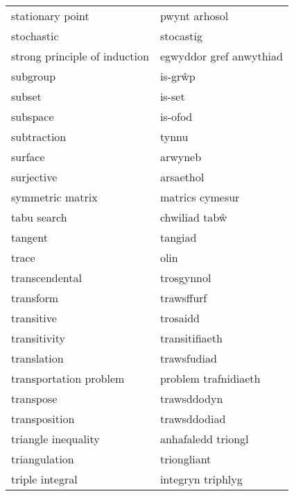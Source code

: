 \begin{supertabular}{p{0.22\textwidth}p{0.22\textwidth}}
                stationary point &                   pwynt arhosol \\
                      stochastic &                       stocastig \\
   strong principle of induction &         egwyddor gref anwythiad \\
                        subgroup &                         is-grŵp \\
                          subset &                          is-set \\
                        subspace &                         is-ofod \\
                     subtraction &                           tynnu \\
                         surface &                         arwyneb \\
                      surjective &                       arsaethol \\
                symmetric matrix &                 matrics cymesur \\
                     tabu search &                   chwiliad tabŵ \\
                         tangent &                         tangiad \\
                           trace &                            olin \\
                  transcendental &                      trosgynnol \\
                       transform &                      trawsffurf \\
                      transitive &                        trosaidd \\
                    transitivity &                  transitifiaeth \\
                     translation &                     trawsfudiad \\
          transportation problem &            problem trafnidiaeth \\
                       transpose &                     trawsddodyn \\
                   transposition &                    trawsddodiad \\
             triangle inequality &              anhafaledd triongl \\
                   triangulation &                     triongliant \\
                 triple integral &               integryn triphlyg \\

\end{supertabular}
